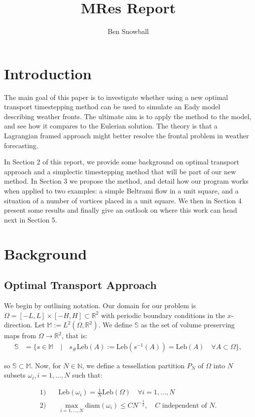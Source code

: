 \documentclass[11pt, oneside]{article}   	%
\title{MRes Report}
\author{Ben Snowball}
\newcommand{\R}{\mathbb{R}}
\newcommand{\M}{\mathbb{M}}
\newcommand{\N}{\mathbb{N}}
\newcommand{\Leb}{\mathrm{Leb}}
\begin{document}
\maketitle
\section{Introduction}

The main goal of this paper is to investigate whether using a new optimal transport timestepping method can be used to simulate an Eady model describing weather fronts. The ultimate aim is to apply the method to the model, and see how it compares to the Eulerian solution. The theory is that a Lagrangian framed approach might better resolve the frontal problem in weather forecasting.

In Section 2 of this report, we provide some background on optimal transport approach and a simplectic timestepping method that will be part of our new method. In Section 3 we propose the method, and detail how our program works when applied to two examples: a simple Beltrami flow in a unit square, and a situation of a number of vortices placed in a unit square. We then in Section 4 present some results and finally give an outlook on where this work can head next in Section 5.


\section{Background}

\subsection{Optimal Transport Approach}

We begin by outlining notation. Our domain for our problem is \(\Omega = [-L, L] \times [-H, H] \subset \R^2\) with periodic boundary conditions in the \(x\)-direction. Let \(\M := L^2(\Omega, \R^2)\). We define \(\mathbb{S}\) as the set of volume preserving maps from \(\Omega \to \R^2\), that is:
\begin{align}
\mathbb{S} &= \{ s \in \M \quad | \quad s_{\#}\Leb(A) := \Leb(s^{-1}(A)) = \Leb(A) \quad \forall A \subset \Omega \},
\end{align}

so \(\mathbb{S} \subset \M\). Now, for \(N \in \N\), we define a tessellation partition \(P_N\) of \(\Omega\) into \(N\) subsets \(\omega_i, i=1,\dots,N\) such that:

\begin{align}
1)& \quad \Leb(\omega_i) = \frac{1}{N}\Leb(\Omega) \quad \forall i = 1,\dots,N \\
2)& \quad \max_{i = 1,\dots,N} \mathrm{diam}(\omega_i) \le CN^{-\frac{1}{2}}, \quad C \text{ independent of } N.
\end{align}
\end{document}
